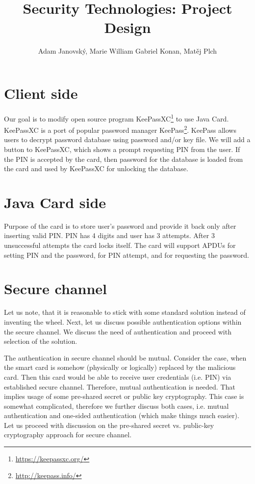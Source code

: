 \documentclass[12pt,a4paper]{article}
\title{Security Technologies: Project Design}
\author{Adam Janovský, Marie William Gabriel Konan, Matěj Plch}
\date{}
\begin{document}
\maketitle
\section{Client side}
Our goal is to modify open source program KeePassXC\footnote{\url{https://keepassxc.org/}} to use Java Card. KeePassXC is a port of popular password manager KeePass\footnote{\url{http://keepass.info/}}. KeePass allows users to decrypt password database using password and/or key file. We will add a button to KeePassXC, which shows a prompt requesting PIN from the user. If the PIN is accepted by the card, then password for the database is loaded from the card and used by KeePassXC for unlocking the database.

\section{Java Card side}
Purpose of the card is to store user's password and provide it back only after inserting valid PIN. PIN has 4 digits and user has 3 attempts. After 3 unsuccessful attempts the card locks itself. The card will support APDUs for setting PIN and the password, for PIN attempt, and for requesting the password.

\section{Secure channel}
Let us note, that it is reasonable to stick with some standard solution instead of inventing the wheel. Next, let us discuss possible authentication options within the secure channel. We discuss the need of authentication and proceed with selection of the solution.

The authentication in secure channel should be mutual. Consider the case, when the smart card is somehow (physically or logically) replaced by the malicious card. Then this card would be able to receive user credentials (i.e. PIN) via established secure channel. Therefore, mutual authentication is needed. That implies usage of some pre-shared secret or public key cryptography. This case is somewhat complicated, therefore we further discuss both cases, i.e. mutual authentication and one-sided authentication (which make things much easier). 
Let us proceed with discussion on the pre-shared secret vs. public-key cryptography approach for secure channel. 
\end{document}
